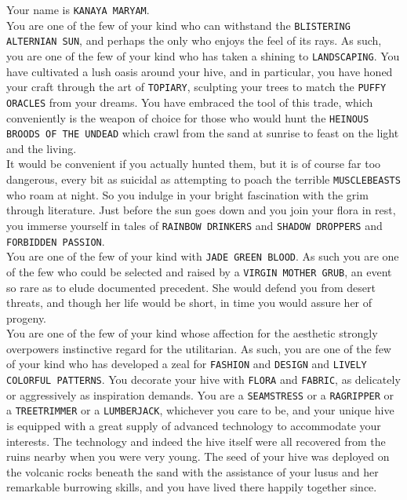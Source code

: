 \documentclass{42-en}
\begin{document}
    \newpage

    Your name is \texttt{KANAYA MARYAM}.\\

    You are one of the few of your kind who can withstand the \texttt{BLISTERING ALTERNIAN SUN},
    and perhaps the only who enjoys the feel of its rays.
    As such, you are one of the few of your kind who has taken a shining to \texttt{LANDSCAPING}.
    You have cultivated a lush oasis around your hive, and in particular,
    you have honed your craft through the art of \texttt{TOPIARY},
    sculpting your trees to match the \texttt{PUFFY ORACLES} from your dreams.
    You have embraced the tool of this trade,
    which conveniently is the weapon of choice for those who would hunt the
    \texttt{HEINOUS BROODS OF THE UNDEAD} which crawl from the sand at sunrise to feast on the light and the living.\\

    It would be convenient if you actually hunted them,
    but it is of course far too dangerous,
    every bit as suicidal as attempting to poach the terrible \texttt{MUSCLEBEASTS} who roam at night.
    So you indulge in your bright fascination with the grim through literature.
    Just before the sun goes down and you join your flora in rest,
    you immerse yourself in tales of \texttt{RAINBOW DRINKERS} and \texttt{SHADOW DROPPERS} and \texttt{FORBIDDEN PASSION}.\\

    You are one of the few of your kind with \texttt{JADE GREEN BLOOD}.
    As such you are one of the few who could be selected and raised by a \texttt{VIRGIN MOTHER GRUB},
    an event so rare as to elude documented precedent.
    She would defend you from desert threats,
    and though her life would be short,
    in time you would assure her of progeny.\\

    You are one of the few of your kind whose affection for the aesthetic strongly overpowers
    instinctive regard for the utilitarian.
    As such, you are one of the few of your kind who has developed a zeal for
    \texttt{FASHION} and \texttt{DESIGN} and \texttt{LIVELY COLORFUL PATTERNS}.
    You decorate your hive with \texttt{FLORA} and \texttt{FABRIC}, as delicately or aggressively as inspiration demands.
    You are a \texttt{SEAMSTRESS} or a \texttt{RAGRIPPER} or a \texttt{TREETRIMMER} or a \texttt{LUMBERJACK}, whichever you care to be,
    and your unique hive is equipped with a great supply of advanced technology to accommodate your interests.
    The technology and indeed the hive itself were all recovered from the ruins nearby when you were very young.
    The seed of your hive was deployed on the volcanic rocks beneath the sand with the assistance of your lusus
    and her remarkable burrowing skills, and you have lived there happily together since.\\
\end{document}
